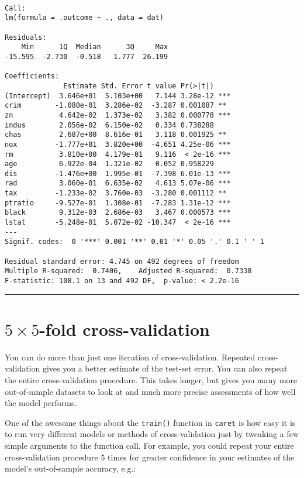 \documentclass[]{book}
\begin{document}
\begin{verbatim}

Call:
lm(formula = .outcome ~ ., data = dat)

Residuals:
    Min      1Q  Median      3Q     Max 
-15.595  -2.730  -0.518   1.777  26.199 

Coefficients:
              Estimate Std. Error t value Pr(>|t|)    
(Intercept)  3.646e+01  5.103e+00   7.144 3.28e-12 ***
crim        -1.080e-01  3.286e-02  -3.287 0.001087 ** 
zn           4.642e-02  1.373e-02   3.382 0.000778 ***
indus        2.056e-02  6.150e-02   0.334 0.738288    
chas         2.687e+00  8.616e-01   3.118 0.001925 ** 
nox         -1.777e+01  3.820e+00  -4.651 4.25e-06 ***
rm           3.810e+00  4.179e-01   9.116  < 2e-16 ***
age          6.922e-04  1.321e-02   0.052 0.958229    
dis         -1.476e+00  1.995e-01  -7.398 6.01e-13 ***
rad          3.060e-01  6.635e-02   4.613 5.07e-06 ***
tax         -1.233e-02  3.760e-03  -3.280 0.001112 ** 
ptratio     -9.527e-01  1.308e-01  -7.283 1.31e-12 ***
black        9.312e-03  2.686e-03   3.467 0.000573 ***
lstat       -5.248e-01  5.072e-02 -10.347  < 2e-16 ***
---
Signif. codes:  0 '***' 0.001 '**' 0.01 '*' 0.05 '.' 0.1 ' ' 1

Residual standard error: 4.745 on 492 degrees of freedom
Multiple R-squared:  0.7406,    Adjusted R-squared:  0.7338 
F-statistic: 108.1 on 13 and 492 DF,  p-value: < 2.2e-16
\end{verbatim}

\begin{center}\rule{0.5\linewidth}{\linethickness}\end{center}

\section{\texorpdfstring{\(5 \times 5\)-fold
cross-validation}{5 \textbackslash{}times 5-fold cross-validation}}\label{times-5-fold-cross-validation}

You can do more than just one iteration of cross-validation. Repeated
cross-validation gives you a better estimate of the test-set error. You
can also repeat the entire cross-validation procedure. This takes
longer, but gives you many more out-of-sample datasets to look at and
much more precise assessments of how well the model performs.

One of the awesome things about the \texttt{train()} function in
\texttt{caret} is how easy it is to run very different models or methods
of cross-validation just by tweaking a few simple arguments to the
function call. For example, you could repeat your entire
cross-validation procedure 5 times for greater confidence in your
estimates of the model's out-of-sample accuracy, e.g.:
\end{document}
